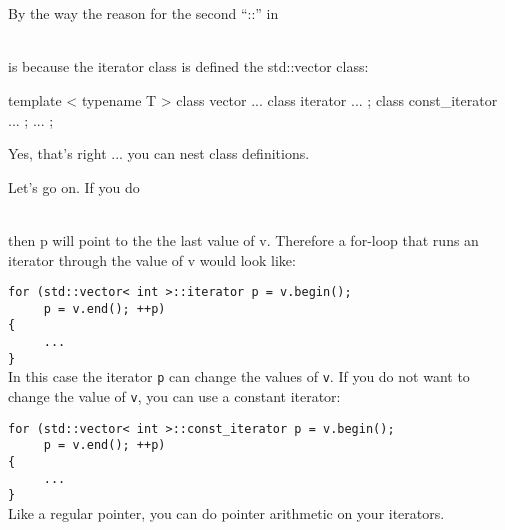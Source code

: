 \\
\\

By the way the reason for the second ``::'' in

\\

is because the iterator class is defined  the std::vector
class:

\begin{console}
template < typename T >
class vector
{
...
    class iterator
    {
        ...
    };  
    class const_iterator
    {
        ...
    };
    ...
};
\end{console}

Yes, that's right ... you can nest class definitions.

Let's go on. If you do

\\

then p will point to the  the last value
of v. Therefore a for-loop that runs an iterator through the value of v
would look like:

\verb!for (std::vector< int >::iterator p = v.begin();!\\
\verb!     p = v.end(); ++p)!\\
\verb!{!\\
\verb!     ...!\\
\verb!}!\\

In this case the iterator \texttt{p} can change the values of \texttt{v}. If
you do not want to change the value of \texttt{v}, you can use a constant
iterator:

\verb!for (std::vector< int >::const_iterator p = v.begin();!\\
\verb!     p = v.end(); ++p)!\\
\verb!{!\\
\verb!     ...!\\
\verb!}!\\

Like a regular pointer, you can do pointer arithmetic on your iterators.

\\
\\
\\
\\

